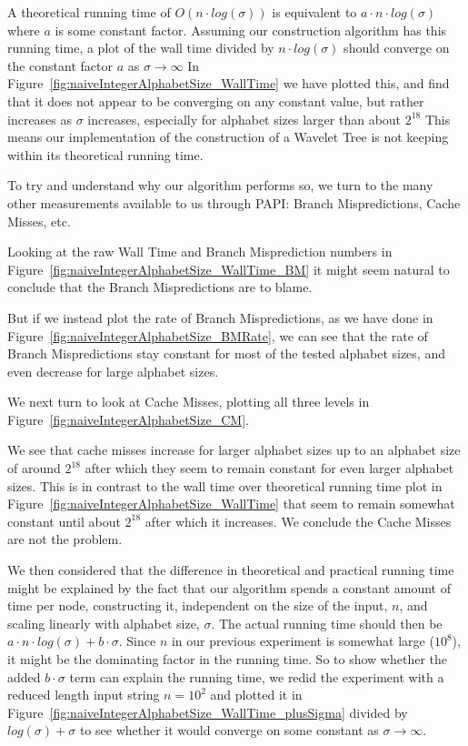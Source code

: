 A theoretical running time of $O(n \cdot log(\sigma))$ is equivalent to $a \cdot n \cdot log(\sigma)$ where $a$ is some constant factor.
Assuming our construction algorithm has this running time, a plot of the wall time divided by $n \cdot log(\sigma)$ should converge on the constant factor $a$ as $\sigma \rightarrow \infty$
In Figure~\ref{fig:naiveIntegerAlphabetSize_WallTime} we have plotted this, and find that it does not appear to be converging on any constant value, but rather increases as $\sigma$ increases, especially for alphabet sizes larger than about $2^{18}$
This means our implementation of the construction of a Wavelet Tree is not keeping within its theoretical running time.



To try and understand why our algorithm performs so, we turn to the many other measurements available to us through PAPI: Branch Mispredictions, Cache Misses, etc.

Looking at the raw Wall Time and Branch Misprediction numbers in Figure~\ref{fig:naiveIntegerAlphabetSize_WallTime_BM} it might seem natural to conclude that the Branch Mispredictions are to blame.

But if we instead plot the rate of Branch Mispredictions, as we have done in Figure~\ref{fig:naiveIntegerAlphabetSize_BMRate}, we can see that the rate of Branch Mispredictions stay constant for most of the tested alphabet sizes, and even decrease for large alphabet sizes.

We next turn to look at Cache Misses, plotting all three levels in Figure~\ref{fig:naiveIntegerAlphabetSize_CM}.

We see that cache misses increase for larger alphabet sizes up to an alphabet size of around $2^{18}$ after which they seem to remain constant for even larger alphabet sizes.
This is in contrast to the wall time over theoretical running time plot in Figure~\ref{fig:naiveIntegerAlphabetSize_WallTime} that seem to remain somewhat constant until about $2^{18}$ after which it increases.
We conclude the Cache Misses are not the problem.

We then considered that the difference in theoretical and practical running time might be explained by the fact that our algorithm spends a constant amount of time per node, constructing it, independent on the size of the input, $n$, and scaling linearly with alphabet size, $\sigma$.
The actual running time should then be $a \cdot n \cdot log(\sigma) + b \cdot \sigma$.
Since $n$ in our previous experiment is somewhat large ($10^8$), it might be the dominating factor in the running time.
So to show whether the added $b \cdot \sigma$ term can explain the running time, we redid the experiment with a reduced length input string $n = 10^2$ and plotted it in Figure~\ref{fig:naiveIntegerAlphabetSize_WallTime_plusSigma} divided by $log(\sigma) + \sigma$ to see whether it would converge on some constant as $\sigma \rightarrow \infty$.

